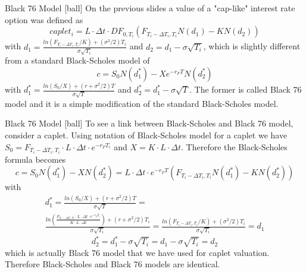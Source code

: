 \documentclass{beamer}
\begin{document}
\begin{frame}{Black 76 Model}
[ball]
On the previous slides a value of a "cap-like" interest rate option was defined as
\begin{equation}
caplet_i = L \cdot \Delta t \cdot DF_{0, T_i} \left(F_{T_i - \Delta T_i, T_i}N(d_1) - KN(d_2) \right)
\end{equation}
with $d_1 = \frac{ln(F_{T_i - \Delta T_i, T_i}/K) + (\sigma^2/2)T_i}{\sigma \sqrt{T_i}}$ and $d_2 = d_1 - \sigma \sqrt{T_i}$, which is slightly different from a standard Black-Scholes model of
\begin{equation}
c = S_0N(d_1^*) - Xe^{-r_F T}N(d_2^*)
\end{equation}
with $d_1^* = \frac{ln(S_0/X) + (r + \sigma^2/2)T}{\sigma \sqrt{T}}$ and $d_2^* = d_1^* - \sigma \sqrt{T}$. The former is called Black 76 model and it is a simple modification of the standard Black-Scholes model.
\end{frame}

\begin{frame}{Black 76 Model}
[ball]
To see a link between Black-Scholes and Black 76 model, consider a caplet. Using notation of Black-Scholes model for a caplet we have $S_0 = F_{T_i - \Delta T_i, T_i} \cdot L \cdot \Delta t \cdot e^{-r_F T_i}$ and $X = K \cdot L \cdot \Delta t$. Therefore the Black-Scholes formula becomes
\begin{equation}
c = S_0N(d_1^*) - XN(d_2^*) =  L \cdot \Delta t \cdot e^{-r_F T}\left(F_{T_i - \Delta T_i, T_i}N(d_1^*) - KN(d_2^*)\right)
\end{equation}
with
\begin{multline}
d_1^* = \frac{ln(S_0/X) + (r + \sigma^2 / 2)T}{\sigma \sqrt{T}} =\\
\frac{ln\left(\frac{F_{T_i - \Delta T_i, T_i} \cdot L \cdot \Delta t \cdot e^{-r_F T_i}}{K \cdot L \cdot \Delta t}\right) + (r + \sigma^2 / 2)T_i}{\sigma \sqrt{T_i}} = \frac{ln(F_{T_i - \Delta T_i, T_i}/K) + (\sigma^2 / 2)T_i}{\sigma \sqrt{T_i}} = d_1
\end{multline}
\begin{equation}
d_2^* = d_1^* - \sigma \sqrt{T_i} = d_1 - \sigma \sqrt{T_i} = d_2
\end{equation}
which is actually Black 76 model that we have used for caplet valuation. Therefore Black-Scholes and Black 76 models are identical.
\end{frame}
\end{document}
